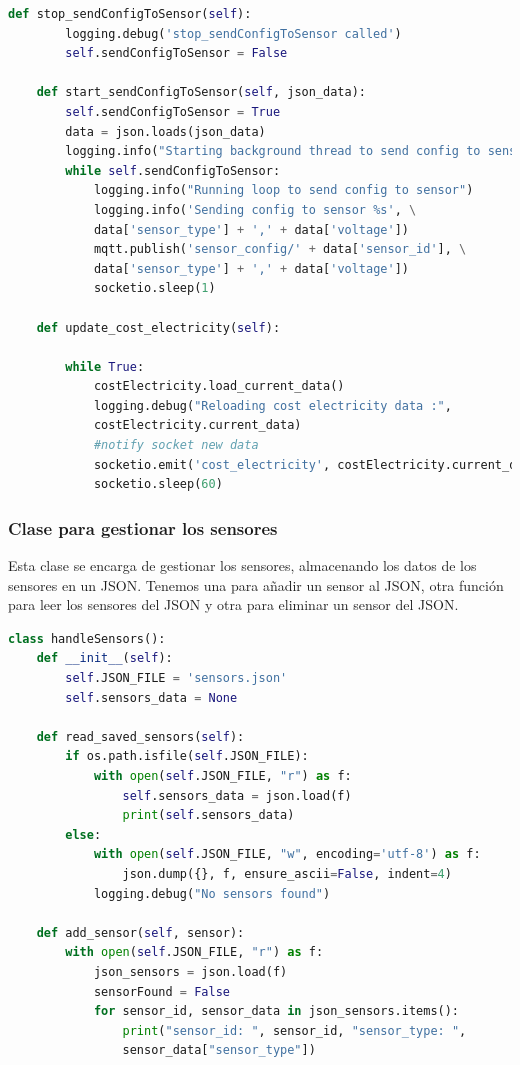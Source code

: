 \begin{titlepage}
\begin{lstlisting}[language=python]
    def stop_sendConfigToSensor(self):
        logging.debug('stop_sendConfigToSensor called')
        self.sendConfigToSensor = False

    def start_sendConfigToSensor(self, json_data):
        self.sendConfigToSensor = True
        data = json.loads(json_data)
        logging.info("Starting background thread to send config to sensor")
        while self.sendConfigToSensor:
            logging.info("Running loop to send config to sensor")
            logging.info('Sending config to sensor %s', \
			data['sensor_type'] + ',' + data['voltage'])
            mqtt.publish('sensor_config/' + data['sensor_id'], \
			data['sensor_type'] + ',' + data['voltage'])
            socketio.sleep(1)
    
    def update_cost_electricity(self):
        
        while True:
            costElectricity.load_current_data()
            logging.debug("Reloading cost electricity data :", 
			costElectricity.current_data)
            #notify socket new data
            socketio.emit('cost_electricity', costElectricity.current_data)
            socketio.sleep(60)
\end{lstlisting}

\subsubsection{Clase para gestionar los sensores}
Esta clase se encarga de gestionar los sensores, almacenando los datos de los sensores en un JSON. Tenemos una para añadir un sensor al JSON, otra función para leer los sensores del JSON y otra para eliminar un sensor del JSON.\\

\begin{lstlisting}[language=python]
class handleSensors():
    def __init__(self):
        self.JSON_FILE = 'sensors.json'
        self.sensors_data = None
    
    def read_saved_sensors(self):
        if os.path.isfile(self.JSON_FILE):
            with open(self.JSON_FILE, "r") as f:
                self.sensors_data = json.load(f)
                print(self.sensors_data)
        else:
            with open(self.JSON_FILE, "w", encoding='utf-8') as f:
                json.dump({}, f, ensure_ascii=False, indent=4)
            logging.debug("No sensors found")

    def add_sensor(self, sensor):
        with open(self.JSON_FILE, "r") as f:
            json_sensors = json.load(f)
            sensorFound = False
            for sensor_id, sensor_data in json_sensors.items():
                print("sensor_id: ", sensor_id, "sensor_type: ", 
				sensor_data["sensor_type"])


\end{lstlisting}
\end{titlepage}
